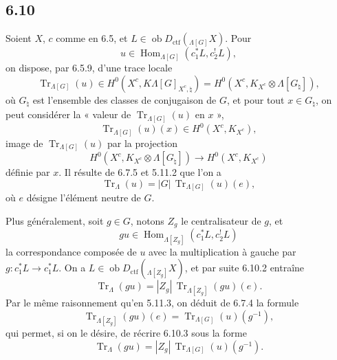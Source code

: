 \documentclass[11pt]{article}
\DeclareMathOperator{\Hom}{Hom}
\providecommand{\Tr}{\operatorname{Tr}}
\providecommand{\Tr}{\operatorname{Tr}}
\providecommand{\Ob}{\operatorname{ob}}
\providecommand{\Tr}{\operatorname{Tr}}
\providecommand{\Hom}{\operatorname{Hom}}
\providecommand{\Ob}{\operatorname{ob}}
\providecommand{\Tr}{\operatorname{Tr}}
\providecommand{\Ob}{\operatorname{Ob}}
\providecommand{\Hom}{\operatorname{Hom}}
\providecommand{\Tr}{\operatorname{Tr}}
\providecommand{\Ob}{\operatorname{ob}}
\providecommand{\Ob}{\operatorname{Ob}}
\begin{document}
\subsection*{6.10}
Soient $X$, $c$ comme en 6.5, et $L\in\Ob D_{\mathrm{ctf}}({}_{\Lambda[G]}X)$. Pour
\[
u\in\Hom_{\Lambda[G]}(c_1^*L,c_2^!L),
\]
on dispose, par 6.5.9, d'une trace locale
\begin{equation}
\Tr_{\Lambda[G]}(u)\in
H^0(X^c,K\Lambda[G]_{X^c,\natural})
=H^0(X^c,K_{X^c}\otimes\Lambda[G_{\natural}]),
\tag{6.10.1}
\end{equation}
où $G_{\natural}$ est l'ensemble des classes de conjugaison de $G$, et pour tout $x\in G_{\natural}$, on peut considérer la « valeur de $\Tr_{\Lambda[G]}(u)$ en $x$ »,
\[
\Tr_{\Lambda[G]}(u)(x)\in H^0(X^c,K_{X^c}),
\]
image de $\Tr_{\Lambda[G]}(u)$ par la projection
\[
H^0(X^c,K_{X^c}\otimes\Lambda[G_{\natural}])
\longrightarrow H^0(X^c,K_{X^c})
\]
définie par $x$. Il résulte de 6.7.5 et 5.11.2 que l'on a
\begin{equation}
\Tr_{\Lambda}(u)=|G|\,\Tr_{\Lambda[G]}(u)(e),
\tag{6.10.2}
\end{equation}
où $e$ désigne l'élément neutre de $G$.

Plus généralement, soit $g\in G$, notons $Z_g$ le centralisateur de $g$, et
\[
gu\in\Hom_{\Lambda[Z_g]}(c_1^*L,c_2^!L)
\]
la correspondance composée de $u$ avec la multiplication à gauche par $g:c_1^*L\to c_1^*L$. On a $L\in\Ob D_{\mathrm{ctf}}({}_{\Lambda[Z_g]}X)$, et par suite 6.10.2 entraîne
\begin{equation}
\Tr_{\Lambda}(gu)=|Z_g|\,\Tr_{\Lambda[Z_g]}(gu)(e).
\tag{6.10.3}
\end{equation}
Par le même raisonnement qu'en 5.11.3, on déduit de 6.7.4 la formule
\begin{equation}
\Tr_{\Lambda[Z_g]}(gu)(e)=\Tr_{\Lambda[G]}(u)(g^{-1}),
\tag{6.10.4}
\end{equation}
qui permet, si on le désire, de récrire 6.10.3 sous la forme
\begin{equation}
\Tr_{\Lambda}(gu)=|Z_g|\,\Tr_{\Lambda[G]}(u)(g^{-1}).
\tag{6.10.5}
\end{equation}
\end{document}
